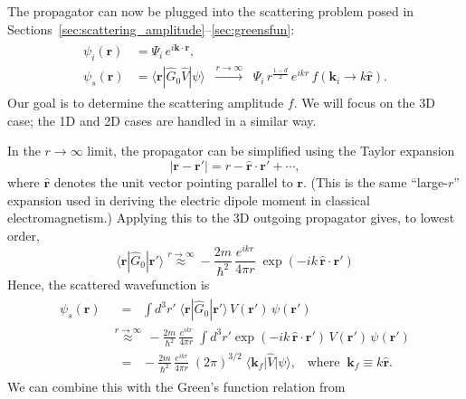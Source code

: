 \documentclass[pra,12pt]{revtex4}
\begin{document}
The propagator can now be plugged into the scattering problem
posed in Sections~\ref{sec:scattering_amplitude}--\ref{sec:greensfun}:
\begin{align}
  \begin{aligned} \psi_i(\mathbf{r}) &= \Psi_i \, e^{i\mathbf{k}\cdot\mathbf{r}}, \\ \psi_s(\mathbf{r}) &= \langle\mathbf{r}| \hat{G}_0 \hat{V} |\psi\rangle \;\; \overset{r\rightarrow\infty}{\longrightarrow}\;\; \Psi_i \, r^{\frac{1-d}{2}} \, e^{ikr} \, f(\mathbf{k}_i\rightarrow k\hat{\mathbf{r}}).
  \end{aligned}
\end{align}
Our goal is to determine the scattering amplitude $f$.  We will focus
on the 3D case; the 1D and 2D cases are handled in a similar way.

In the $r\rightarrow\infty$ limit, the propagator can be simplified
using the Taylor expansion
\begin{equation}
  |\mathbf{r} - \mathbf{r}'| = r - \hat{\mathbf{r}} \cdot \mathbf{r}' + \cdots,
\end{equation}
where $\hat{\mathbf{r}}$ denotes the unit vector pointing parallel to
$\mathbf{r}$.  (This is the same ``large-$r$'' expansion used in
deriving the electric dipole moment in classical electromagnetism.)
Applying this to the 3D outgoing propagator gives, to lowest order,
\begin{equation}
  \langle\mathbf{r}|\hat{G}_0|\mathbf{r}'\rangle \overset{r\rightarrow\infty}{\approx} - \frac{2m}{\hbar^2}\, \frac{e^{ikr}}{4\pi r}\; \exp\left(-ik \, \hat{\mathbf{r}} \cdot \mathbf{r}'\right)
\end{equation}
Hence, the scattered wavefunction is
\begin{align}
  \begin{aligned}\psi_s(\mathbf{r}) &\;\;= \;\; \int d^3r'\; \langle\mathbf{r}|\hat{G}_0|\mathbf{r}'\rangle\, V(\mathbf{r}')\, \psi(\mathbf{r}') \\ &\overset{r\rightarrow\infty}{\approx} \, - \frac{2m}{\hbar^2} \, \frac{e^{ikr}}{4\pi r}\; \int d^3r' \exp\left(-ik \, \hat{\mathbf{r}} \cdot \mathbf{r}'\right)\, V(\mathbf{r}')\, \psi(\mathbf{r}') \\ &\;\;=\;\; - \frac{2m}{\hbar^2} \, \frac{e^{ikr}}{4\pi r} \; (2\pi)^{3/2} \; \big\langle \mathbf{k}_f \big|\hat{V}\big|\psi\big\rangle, \;\;\;\mathrm{where}\;\; \mathbf{k}_f \equiv k \hat{\mathbf{r}}. \end{aligned}
\end{align}
We can combine this with the Green's function relation from
\end{document}
